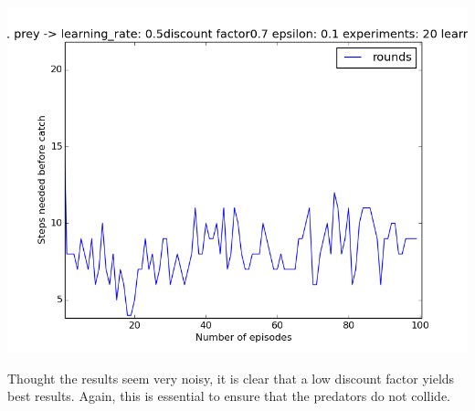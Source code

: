 \begin{center}
	\includegraphics[scale=0.3]{minimax_100rounds_20exp_disc07_alpha05}
	\label{graph:1vs1_disc_07}
\end{center}

Thought the results seem very noisy, it is clear that a low discount factor yields best results. Again, this is essential to ensure that the predators do not collide.
